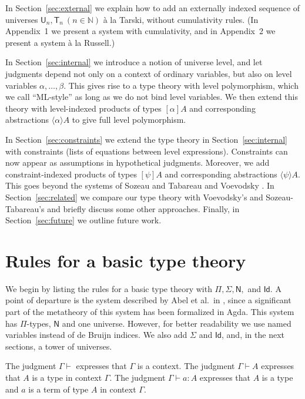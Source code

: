 \documentclass[11pt,a4paper]{article}
\theoremstyle{definition}
\newcommand{\Id}{\mathsf{Id}}
\newcommand{\NN}{\mathsf{N}}
\newcommand{\Nat}{\mathbb{N}}
\newcommand{\UU}{\mathsf{U}}
\newcommand{\lam}[1]{{\langle}#1{\rangle}}
\newcommand{\T}{\mathsf{T}}
\begin{document}
In Section~\ref{sec:external} we explain how to add an externally indexed 
sequence of universes
$\UU_n, \T_n~(n\in\Nat)$ \`a la Tarski, without cumulativity rules.
(In Appendix~1 we present a system with cumulativity,
and in Appendix~2 we present a system \`a la Russell.)

In Section~\ref{sec:internal} we introduce a notion of universe level,
and let judgments depend not only on a context of ordinary variables,
but also on level variables $\alpha, \ldots, \beta$.
This gives rise to a type theory with level polymorphism, which we call
``ML-style'' as long as we do not bind level variables.
We then extend this theory with level-indexed products of
types $[\alpha]A$ and corresponding abstractions $\lam{\alpha}A$
to give full level polymorphism.

In Section~\ref{sec:constraints} we extend the type theory in
Section~\ref{sec:internal} with constraints (lists of equations between level expressions). Constraints can now appear as assumptions in hypothetical judgments. Moreover, we add
constraint-indexed products of types $[\psi]A$ and corresponding
abstractions $\lam{\psi}A$. This goes beyond the systems of Sozeau and Tabareau \cite{SozeauTabareau:coq} and Voevodsky \cite{VV}.
In Section~\ref{sec:related} we
compare our type theory with Voevodsky's and Sozeau-Tabareau's
and briefly discuss some other approaches.
Finally, in Section~\ref{sec:future} we outline future work.

\section{Rules for a basic type theory}\label{sec:basic}

We begin by listing the rules for a basic type theory
with $\Pi, \Sigma, \NN,$ and $\Id$. A point of departure is
the system described by Abel et al.\ in \cite{abel18}, since a
significant part of the metatheory of this system has been formalized in Agda.
This system has $\Pi$-types, $\NN$ and one universe.
However, for better readability we use named variables instead
of de Bruijn indices. We also add $\Sigma$ and $\Id$, and,
in the next sections, a tower of universes.

The judgment $\Gamma\vdash$ expresses that $\Gamma$ is a context.
The judgment $\Gamma\vdash A$ expresses that $A$ is a type in context $\Gamma$.
The judgment $\Gamma\vdash a:A$ expresses that $A$ is a type
and $a$ is a term of type $A$ in context $\Gamma$.
\end{document}
